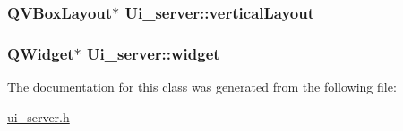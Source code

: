 \hypertarget{classUi__server_acf9b7150d040d4ec4d85a266e891a0e4}{
\subsubsection[{vertical\-Layout}]{\setlength{\rightskip}{0pt plus 5cm}Q\-V\-Box\-Layout$\ast$ Ui\-\_\-server\-::vertical\-Layout}}\label{classUi__server_acf9b7150d040d4ec4d85a266e891a0e4}
\hypertarget{classUi__server_ace92325e6495e01222226b9ad85a0dfe}{
\subsubsection[{widget}]{\setlength{\rightskip}{0pt plus 5cm}Q\-Widget$\ast$ Ui\-\_\-server\-::widget}}\label{classUi__server_ace92325e6495e01222226b9ad85a0dfe}


The documentation for this class was generated from the following file\-:\begin{DoxyCompactItemize}
\item 
\hyperlink{ui__server_8h}{ui\-\_\-server.\-h}\end{DoxyCompactItemize}
